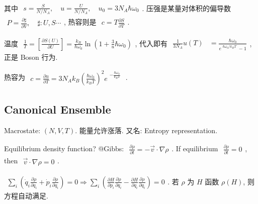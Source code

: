 \documentclass[../../main.tex]{subfiles}
\begin{document}
其中 $\begin{aligned}
    s = \frac{S}{N/N_{A}},\quad u = \frac{U}{N/N_{A}},\quad u_{0} = 3N_{A}\hbar\omega_{0}
\end{aligned}$. 压强是某量对体积的偏导数 $\begin{aligned}
    P = \frac{\partial\sharp}{\partial V},\quad \sharp: U,S\cdots
\end{aligned}$, 热容则是 $\begin{aligned}
    c = T\frac{\partial S}{\partial T}
\end{aligned}$. 

温度 $\begin{aligned}
    \frac{1}{T} = \left[\frac{\partial S(U)}{\partial U}\right] = \frac{k_{B}}{\hbar\omega_{0}}\ln{\left(1+\frac{3}{u}\hbar\omega_{0}\right)}
\end{aligned}$, 代入即有 $\begin{aligned}
    \frac{1}{3N_{A}}u(T) &= \frac{\hbar\omega_{0}}{e^{\begin{aligned}
        \hbar\omega_{0}/k_{B}T
    \end{aligned}}-1}
\end{aligned}$, 正是 Boson 行为. 

热容为 $\begin{aligned}
    c= \frac{\partial u}{\partial T} = 3N_{A}k_{B}\left(\frac{\hbar\omega_{0}}{k_{B}T}\right)^{2}e^{\begin{aligned}
        -\frac{\hbar\omega_{0}}{k_{B}T}
    \end{aligned}}
\end{aligned}$. 

\subsection{Canonical Ensemble}
Macrostate: $(N,V,T)$. 能量允许涨落. 又名: Entropy representation.

Equilibrium density function? @Gibbs: $\begin{aligned}
    \frac{\partial\rho}{\partial t} = -\vec{v}\cdot \nabla\rho
\end{aligned}$. If equilibrium $\begin{aligned}
    \frac{\partial\rho}{\partial t} = 0
\end{aligned}$, then $\begin{aligned}
    \vec{v}\cdot \nabla\rho = 0
\end{aligned}$. 

$\begin{aligned}
    \sum_{i}\left(\dot{q}_{i}\frac{\partial\rho}{\partial q_{i}} +\dot{p}_{i}\frac{\partial\rho}{\partial q_{i}}\right) = 0 \Rightarrow \sum_{i}\left(\frac{\partial H}{\partial p_{i}}\frac{\partial\rho}{\partial q_{i}} - \frac{\partial H}{\partial q_{i}}\frac{\partial\rho}{\partial q_{i}}\right) = 0
\end{aligned}$. 若 $\rho$ 为 $H$ 函数 $\rho(H)$, 则方程自动满足. 
\end{document}
